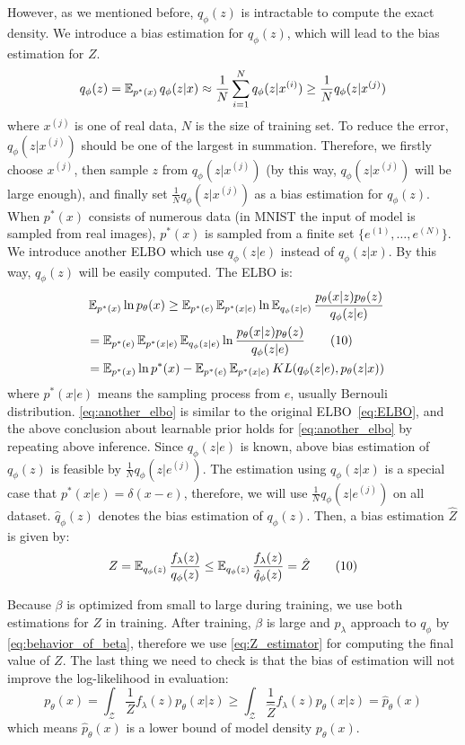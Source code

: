 However, as we mentioned before, $q_\phi(z)$ is intractable to compute the exact density. We introduce a bias estimation for $q_\phi(z)$, which will lead to the bias estimation for $Z$. 
\begin{equation*}
	q_\phi(z) = \operatorname{\mathbb{E}}_{p^*(x)} q_\phi(z|x) \approx \frac{1}{N}\sum_{i=1}^N q_\phi(z|x^{(i)}) \geq \frac{1}{N} q_\phi(z|x^{(j)})
\end{equation*}
where $x^{(j)}$ is one of real data, $N$ is the size of training set. To reduce the error, $q_\phi(z|x^{(j)})$ should be one of the largest in summation. Therefore, we firstly choose $x^{(j)}$, then sample $z$ from $q_\phi(z|x^{(j)})$ (by this way, $q_\phi(z|x^{(j)})$ will be large enough), and finally set $\frac{1}{N} q_\phi(z|x^{(j)})$ as a bias estimation for $q_\phi(z)$. When $p^*(x)$ consists of numerous data (\EG in MNIST the input of model is sampled from real images), $p^*(x)$ is sampled from a finite set $\{e^{(1)}, \ldots, e^{(N)}\}$. We introduce another ELBO which use $q_\phi(z|e)$ instead of $q_\phi(z|x)$. By this way, $q_\phi(z)$ will be easily computed. The ELBO is:
\begin{align*}~\label{eq:another_elbo}
	&\operatorname{\mathbb{E}}_{p^*(x)} \ln p_\theta(x) \geq \operatorname{\mathbb{E}}_{p^*(e)} \operatorname{\mathbb{E}}_{p^*(x|e)} \ln \operatorname{\mathbb{E}}_{q_\phi(z|e)} \frac{p_\theta(x|z)p_\theta(z)}{q_\phi(z|e)} \\
	 &= \operatorname{\mathbb{E}}_{p^*(e)} \operatorname{\mathbb{E}}_{p^*(x|e)} \operatorname{\mathbb{E}}_{q_\phi(z|e)} \ln \frac{p_\theta(x|z)p_\theta(z)}{q_\phi(z|e)} \tag{10} \\
	 &= \operatorname{\mathbb{E}}_{p^*(x)} \ln p^*(x) - \operatorname{\mathbb{E}}_{p^*(e)} \operatorname{\mathbb{E}}_{p^*(x|e)} KL(q_\phi(z|e), p_\theta(z|x))
\end{align*} 
where $p^*(x|e)$ means the sampling process from $e$, usually Bernouli distribution. \cref{eq:another_elbo} is similar to the original ELBO~\cref{eq:ELBO}, and the above conclusion about learnable prior holds for \cref{eq:another_elbo} by repeating above inference. Since $q_\phi(z|e)$ is known, above bias estimation of $q_\phi(z)$ is feasible by $\frac{1}{N} q_\phi(z|e^{(j)})$. The estimation using $q_\phi(z|x)$ is a special case that $p^*(x|e) = \delta(x - e)$, therefore, we will use $\frac{1}{N} q_\phi(z|e^{(j)})$ on all dataset. $\hat{q}_\phi(z)$ denotes the bias estimation of $q_\phi(z)$. Then, a bias estimation $\hat{Z}$ is given by:
\begin{align*}\label{eq:Z_estimator}
	Z = \operatorname{\mathbb{E}}_{q_\phi(z)}\frac{f_\lambda(z)}{q_\phi(z)} \leq \operatorname{\mathbb{E}}_{q_\phi(z)} \frac{f_\lambda(z)}{\hat{q}_\phi(z)} = \hat{Z} \tag{10}
\end{align*}

Because $\beta$ is optimized from small to large during training, we use both estimations for $Z$ in training. After training, $\beta$ is large and $p_\lambda$ approach to $q_\phi$ by \cref{eq:behavior_of_beta}, therefore we use \cref{eq:Z_estimator} for computing the final value of $Z$. The last thing we need to check is that the bias of estimation will not improve the log-likelihood in evaluation:
\begin{equation*}
	p_\theta(x) = \int_{\mathcal{Z}} \frac{1}{Z} f_\lambda(z) p_\theta(x|z) \geq \int_{\mathcal{Z}} \frac{1}{\hat{Z}} f_\lambda(z) p_\theta(x|z) = \hat{p}_\theta(x)
\end{equation*}
which means $\hat{p}_\theta(x)$ is a lower bound of model density $p_\theta(x)$. 

